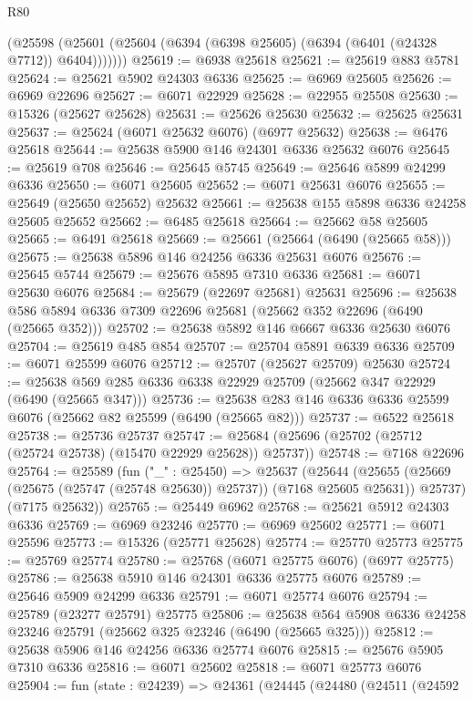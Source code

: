 \begin{lexlean}{R80}
\begin{coremodule}
        (@25598 (@25601 (@25604 (@6394 (@6398 @25605) (@6394 (@6401 (@24328 @7712)) @6404)))))))
@25619 := @6938 @25618
@25621 := @25619 @883 @5781
@25624 := @25621 @5902 @24303 @6336
@25625 := @6969 @25605
@25626 := @6969 @22696
@25627 := @6071 @22929
@25628 := @22955 @25508
@25630 := @15326 (@25627 @25628)
@25631 := @25626 @25630
@25632 := @25625 @25631
@25637 := @25624 (@6071 @25632 @6076) (@6977 @25632)
@25638 := @6476 @25618
@25644 := @25638 @5900 @146 @24301 @6336 @25632 @6076
@25645 := @25619 @708
@25646 := @25645 @5745
@25649 := @25646 @5899 @24299 @6336
@25650 := @6071 @25605
@25652 := @6071 @25631 @6076
@25655 := @25649 (@25650 @25652) @25632
@25661 := @25638 @155 @5898 @6336 @24258 @25605 @25652
@25662 := @6485 @25618
@25664 := @25662 @58 @25605
@25665 := @6491 @25618
@25669 := @25661 (@25664 (@6490 (@25665 @58)))
@25675 := @25638 @5896 @146 @24256 @6336 @25631 @6076
@25676 := @25645 @5744
@25679 := @25676 @5895 @7310 @6336
@25681 := @6071 @25630 @6076
@25684 := @25679 (@22697 @25681) @25631
@25696 := @25638 @586 @5894 @6336 @7309 @22696 @25681 (@25662 @352 @22696 (@6490 (@25665 @352)))
@25702 := @25638 @5892 @146 @6667 @6336 @25630 @6076
@25704 := @25619 @485 @854
@25707 := @25704 @5891 @6339 @6336
@25709 := @6071 @25599 @6076
@25712 := @25707 (@25627 @25709) @25630
@25724 := @25638 @569 @285 @6336 @6338 @22929 @25709 (@25662 @347 @22929 (@6490 (@25665 @347)))
@25736 := @25638 @283 @146 @6336 @6336 @25599 @6076 (@25662 @82 @25599 (@6490 (@25665 @82)))
@25737 := @6522 @25618
@25738 := @25736 @25737
@25747 := @25684 (@25696 (@25702 (@25712 (@25724 @25738) (@15470 @22929 @25628)) @25737))
@25748 := @7168 @22696
@25764 := @25589
    (fun ("_" : @25450) =>
    @25637
      (@25644
        (@25655 (@25669 (@25675 (@25747 (@25748 @25630)) @25737)) (@7168 @25605 @25631))
        @25737)
      (@7175 @25632))
@25765 := @25449 @6962
@25768 := @25621 @5912 @24303 @6336
@25769 := @6969 @23246
@25770 := @6969 @25602
@25771 := @6071 @25596
@25773 := @15326 (@25771 @25628)
@25774 := @25770 @25773
@25775 := @25769 @25774
@25780 := @25768 (@6071 @25775 @6076) (@6977 @25775)
@25786 := @25638 @5910 @146 @24301 @6336 @25775 @6076
@25789 := @25646 @5909 @24299 @6336
@25791 := @6071 @25774 @6076
@25794 := @25789 (@23277 @25791) @25775
@25806 := @25638 @564 @5908 @6336 @24258 @23246 @25791 (@25662 @325 @23246 (@6490 (@25665 @325)))
@25812 := @25638 @5906 @146 @24256 @6336 @25774 @6076
@25815 := @25676 @5905 @7310 @6336
@25816 := @6071 @25602
@25818 := @6071 @25773 @6076
@25904 := fun (state : @24239) =>
  @24361
    (@24445
      (@24480
        (@24511
          (@24592

\end{coremodule}
\end{lexlean}
